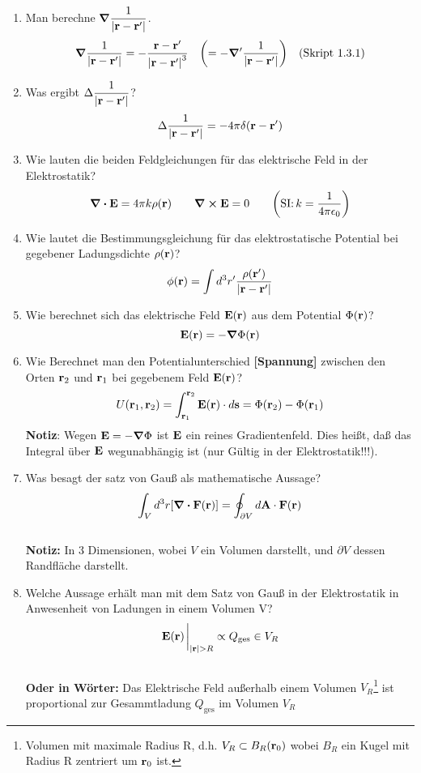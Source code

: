 \documentclass{scrartcl}
\newcommand{\rr}[1]{\frac{#1}{\abs{\vb{r}-\vb{r}'}}}
\newcommand{\ds}{\displaystyle}
\begin{document}
  \begin{enumerate}
    \item Man berechne $\ds \grad\rr{1}$.
          $$\ds \grad\rr{1}=
           -\frac{\vb r -\vb r'}{\abs{\vb r - \vb r'}^3}\quad
           \qty(=-\grad'\rr{1})\quad\text{(Skript 1.3.1)}$$ 

    \item Was ergibt $\ds \Delta\rr{1}$?
          $$\ds \Delta \rr{1} = -4\pi \delta(\vb r-\vb r')$$
      
    \item Wie lauten die beiden Feldgleichungen für das 
          elektrische Feld in der Elektrostatik?
          $$\ds \div \vb E=4\pi k\rho(\vb r)\qquad\curl\vb E=0
           \qquad\qty(\text{SI:}\,k=\frac{1}{4\pi\epsilon_0})$$
    
    \item Wie lautet die Bestimmungsgleichung für das elektrostatische 
          Potential bei gegebener Ladungsdichte $\rho(\vb r)$?
          $$\ds \phi(\vb r)=\int d^3r'\rr{\rho(\vb r')}$$

    \item Wie berechnet sich das elektrische Feld $\vb E (\vb r)$ aus dem
          Potential $\Phi(\vb r)$?
          $$\ds \vb E(\vb r) = - \grad \Phi (\vb r)$$

    \item Wie Berechnet man den Potentialunterschied \textbf{[Spannung]}
          zwischen den Orten 
          $\vb r_2$ und $\vb r_1$ bei gegebenem Feld $\vb E(\vb r)$?
          $$\ds U(\vb r_1, \vb r_2)=\int_{\vb r_1}^{\vb r_2}
           \vb E(\vb r)\cdot d\vb s
           =\Phi(\vb r_2)-\Phi(\vb r_1)$$
          \textbf{Notiz}: Wegen $\vb E=-\grad\Phi$ ist $\vb E$ ein reines
          Gradientenfeld. Dies heißt, daß das Integral über $\vb E$
          wegunabhängig ist (nur Gültig in der Elektrostatik!!!).

    \item Was besagt der satz von Gauß als mathematische Aussage?
          $$\ds \int_V d^3r \qty[\div \vb F(\vb r)]=
           \oint_{\partial V}d\vb A\cdot \vb F(\vb r)$$\\
          \textbf{Notiz:} In 3 Dimensionen, wobei $V$ ein Volumen darstellt,
          und $\partial V$ dessen Randfläche darstellt.

    \item Welche Aussage erhält man mit dem Satz von Gauß in der 
          Elektrostatik in Anwesenheit von Ladungen in einem Volumen V?
          $$\vb E(\vb r)\eval_{\abs{\vb r} > R}
            \propto Q_{\text{ges}}\in V_R$$\\
          \textbf{Oder in Wörter:} Das Elektrische Feld außerhalb 
          einem Volumen 
          $V_R$\footnote{Volumen mit 
            maximale Radius R, d.h. $V_R\subset B_R(\vb r_0)$ 
            wobei $B_R$ ein Kugel mit Radius R zentriert um $\vb r_0$ ist.}
          ist proportional zur Gesammtladung $Q_{\text{ges}}$ 
          im Volumen $V_R$


\end{enumerate}
\end{document}
